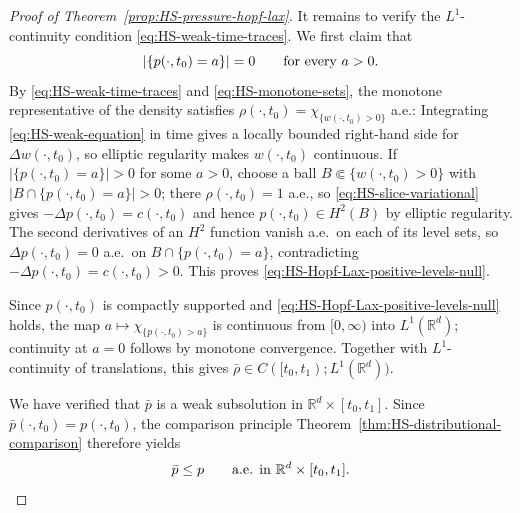 \documentclass[11pt]{amsart}
\numberwithin{equation}{section}
\numberwithin{figure}{section}
\theoremstyle{plain}
\theoremstyle{definition}
\theoremstyle{remark}
\theoremstyle{plain}
\newcommand{\abs}[1]{\lvert #1 \rvert}
\def\R{\mathbb{R}}
\begin{document}
\begin{proof}[Proof of Theorem~\ref{prop:HS-pressure-hopf-lax}]
It remains to verify the \(L^1\)-continuity condition
\eqref{eq:HS-weak-time-traces}.  We first claim that
\begin{equation}\label{eq:HS-Hopf-Lax-positive-levels-null}
    \abs{\{p(\cdot,t_0)=a\}}=0
    \qquad\hbox{for every }a>0 .
\end{equation}
By \eqref{eq:HS-weak-time-traces} and \eqref{eq:HS-monotone-sets}, the monotone
representative of the density satisfies
\(\rho(\cdot,t_0)=\chi_{\{w(\cdot,t_0)>0\}}\) a.e.: 
Integrating
\eqref{eq:HS-weak-equation} in time gives a locally bounded right-hand side for
\(\Delta w(\cdot,t_0)\), so elliptic regularity makes \(w(\cdot,t_0)\)
continuous.  If \(\abs{\{p(\cdot,t_0)=a\}}>0\) for some
\(a>0\), choose a ball \(B\Subset\{w(\cdot,t_0)>0\}\) with
\(\abs{B\cap\{p(\cdot,t_0)=a\}}>0\); there \(\rho(\cdot,t_0)=1\) a.e., so
\eqref{eq:HS-slice-variational} gives \(-\Delta p(\cdot,t_0)=c(\cdot,t_0)\) and
hence \(p(\cdot,t_0)\in H^2(B)\) by elliptic regularity.  The second derivatives
of an \(H^2\) function vanish a.e.\ on each of its level sets, so
\(\Delta p(\cdot,t_0)=0\) a.e.\ on \(B\cap\{p(\cdot,t_0)=a\}\), contradicting
\(-\Delta p(\cdot,t_0)=c(\cdot,t_0)>0\).  This proves
\eqref{eq:HS-Hopf-Lax-positive-levels-null}.

Since \(p(\cdot,t_0)\) is compactly supported and
\eqref{eq:HS-Hopf-Lax-positive-levels-null} holds, the map
\(a\mapsto\chi_{\{p(\cdot,t_0)>a\}}\) is continuous from \([0,\infty)\) into
\(L^1(\R^d)\); continuity at \(a=0\) follows by monotone convergence.  Together
with \(L^1\)-continuity of translations, this gives
\(\bar\rho\in C([t_0,t_1);L^1(\R^d))\).  


We have verified that \(\bar p\) is a weak subsolution in $\R^d\times [t_0,t_1]$. Since
\(\bar p(\cdot,t_0)=p(\cdot,t_0)\), the comparison principle
Theorem~\ref{thm:HS-distributional-comparison} therefore yields
\begin{equation}\label{eq:HS-Hopf-Lax-ae-comparison}
    \bar p\leq p
    \qquad\hbox{a.e. in }\R^d\times[t_0,t_1].
\end{equation}


\end{proof}
\end{document}
